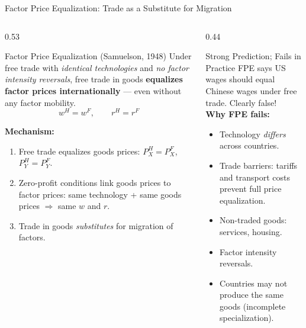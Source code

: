 \documentclass[aspectratio=169]{beamer}
\begin{document}
\begin{frame}[shrink=10]{Factor Price Equalization: Trade as a Substitute for Migration}
\begin{columns}[T]
\begin{column}{0.53\textwidth}
\begin{block}{Factor Price Equalization (Samuelson, 1948)}
Under free trade with \emph{identical technologies} and
\emph{no factor intensity reversals}, free trade in goods
\textbf{equalizes factor prices internationally} ---
even without any factor mobility.
\[w^H = w^F, \qquad r^H = r^F\]
\end{block}
\vspace{0.3em}
\textbf{Mechanism:}
\begin{enumerate}\small
  \item Free trade equalizes goods prices:
        $P_X^H = P_X^F$, $P_Y^H = P_Y^F$.
  \item Zero-profit conditions link goods prices
        to factor prices: same technology + same
        goods prices $\Rightarrow$ same $w$ and $r$.
  \item Trade in goods \emph{substitutes} for migration
        of factors.
\end{enumerate}
\end{column}
\begin{column}{0.44\textwidth}
\begin{alertblock}{Strong Prediction; Fails in Practice}
\small FPE says US wages should equal Chinese wages
under free trade. Clearly false!\\[0.4em]
\textbf{Why FPE fails:}
\begin{itemize}
  \item Technology \emph{differs} across countries.
  \item Trade barriers: tariffs and transport costs
        prevent full price equalization.
  \item Non-traded goods: services, housing.
  \item Factor intensity reversals.
  \item Countries may not produce the same goods
        (incomplete specialization).
\end{itemize}
\end{alertblock}
\end{column}
\end{columns}
\end{frame}
\end{document}
